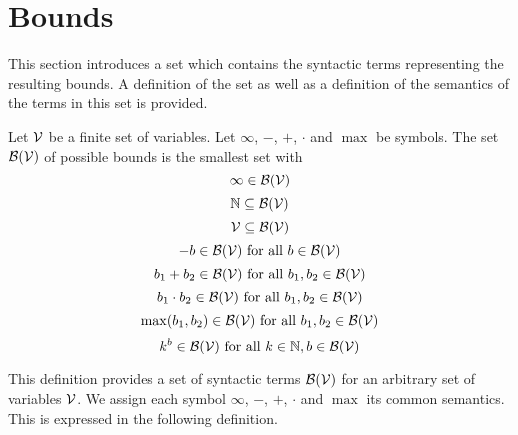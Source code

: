 \section{Bounds}

This section introduces a set which contains the syntactic terms representing the resulting bounds.
A definition of the set as well as a definition of the semantics of the terms in this set is provided.

\begin{definition}
  Let $\mathcal{V}$ be a finite set of variables.
  Let $\infty$, $-$, $+$, $\cdot$ and $\max$ be symbols.
  The set $\mathcal{B}(\mathcal{V})$ of possible bounds is the smallest set with
  \[ \infty \in \mathcal{B}(\mathcal{V}) \]
  \[ \mathbb{N} \subseteq \mathcal{B}(\mathcal{V}) \] 
  \[ \mathcal{V} \subseteq \mathcal{B}(\mathcal{V}) \] 
  \[ -b \in \mathcal{B}(\mathcal{V}) \text{ for all } b \in \mathcal{B}(\mathcal{V}) \] 
  \[ b_1 + b_2 \in \mathcal{B}(\mathcal{V}) \text{ for all } b_1, b_2 \in \mathcal{B}(\mathcal{V}) \] 
  \[ b_1 \cdot b_2 \in \mathcal{B}(\mathcal{V}) \text{ for all } b_1, b_2 \in \mathcal{B}(\mathcal{V}) \] 
  \[ \max(b_1, b_2) \in \mathcal{B}(\mathcal{V}) \text{ for all } b_1, b_2 \in \mathcal{B}(\mathcal{V}) \]
  \[ k^b \in \mathcal{B}(\mathcal{V}) \text{ for all } k \in \mathbb{N}, b \in \mathcal{B}(\mathcal{V}) \]
\end{definition}
This definition provides a set of syntactic terms $\mathcal{B}(\mathcal{V})$ for an arbitrary set of variables $\mathcal{V}$.
We assign each symbol $\infty$, $-$, $+$, $\cdot$ and $\max$ its common semantics.
This is expressed in the following definition.

